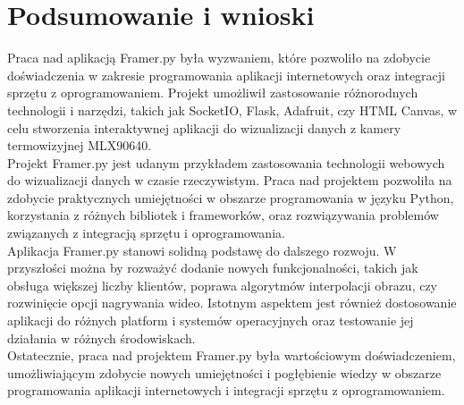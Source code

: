 \documentclass[a4paper,twoside,12pt]{book}
\begin{document}
\chapter{Podsumowanie i wnioski}

Praca nad aplikacją Framer.py była  wyzwaniem, które pozwoliło na zdobycie doświadczenia w zakresie programowania aplikacji internetowych oraz integracji sprzętu z oprogramowaniem. Projekt umożliwił zastosowanie różnorodnych technologii i narzędzi, takich jak SocketIO, Flask, Adafruit, czy HTML Canvas, w celu stworzenia interaktywnej aplikacji do wizualizacji danych z kamery termowizyjnej MLX90640.\\
Projekt Framer.py jest udanym przykładem zastosowania technologii webowych do wizualizacji danych w czasie rzeczywistym. Praca nad projektem pozwoliła na zdobycie praktycznych umiejętności w obszarze programowania w języku Python, korzystania z różnych bibliotek i frameworków, oraz rozwiązywania problemów związanych z integracją sprzętu i oprogramowania.\\
Aplikacja Framer.py stanowi solidną podstawę do dalszego rozwoju. W przyszłości można by rozważyć dodanie nowych funkcjonalności, takich jak obsługa większej liczby klientów, poprawa algorytmów interpolacji obrazu, czy rozwinięcie opcji nagrywania wideo. Istotnym aspektem jest również dostosowanie aplikacji do różnych platform i systemów operacyjnych oraz testowanie jej działania w różnych środowiskach.\\
Ostatecznie, praca nad projektem Framer.py była wartościowym doświadczeniem, umożliwiającym zdobycie nowych umiejętności i pogłębienie wiedzy w obszarze programowania aplikacji internetowych i integracji sprzętu z oprogramowaniem.
\end{document}
